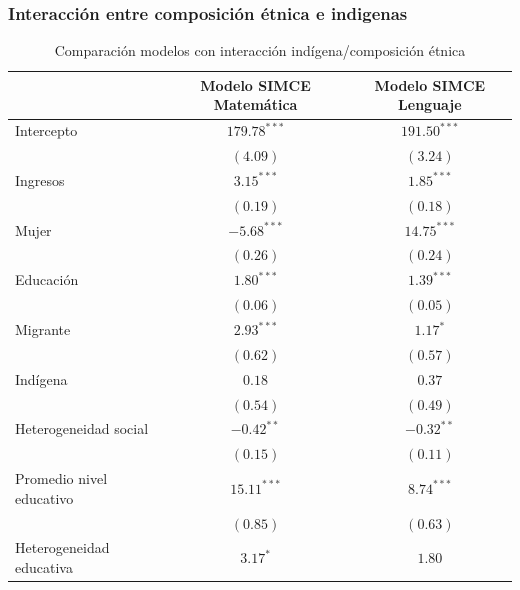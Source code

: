 \documentclass[
]{article}
\begin{document}
\hypertarget{interacciuxf3n-entre-composiciuxf3n-uxe9tnica-e-indigenas}{%
\subsubsection{Interacción entre composición étnica e
indigenas}\label{interacciuxf3n-entre-composiciuxf3n-uxe9tnica-e-indigenas}}

\begin{table}
\caption{Comparación modelos con interacción indígena/composición étnica}
\begin{center}
\begin{tabular}{l c c}
\hline
 & Modelo SIMCE Matemática & Modelo SIMCE Lenguaje \\
\hline
Intercepto                          & $179.78^{***}$ & $191.50^{***}$ \\
                                    & $(4.09)$       & $(3.24)$       \\
Ingresos                            & $3.15^{***}$   & $1.85^{***}$   \\
                                    & $(0.19)$       & $(0.18)$       \\
Mujer                               & $-5.68^{***}$  & $14.75^{***}$  \\
                                    & $(0.26)$       & $(0.24)$       \\
Educación                           & $1.80^{***}$   & $1.39^{***}$   \\
                                    & $(0.06)$       & $(0.05)$       \\
Migrante                            & $2.93^{***}$   & $1.17^{*}$     \\
                                    & $(0.62)$       & $(0.57)$       \\
Indígena                            & $0.18$         & $0.37$         \\
                                    & $(0.54)$       & $(0.49)$       \\
Heterogeneidad social               & $-0.42^{**}$   & $-0.32^{**}$   \\
                                    & $(0.15)$       & $(0.11)$       \\
Promedio nivel educativo            & $15.11^{***}$  & $8.74^{***}$   \\
                                    & $(0.85)$       & $(0.63)$       \\
Heterogeneidad educativa            & $3.17^{*}$     & $1.80$         \\

\end{tabular}
\end{center}
\end{table}
\end{document}

